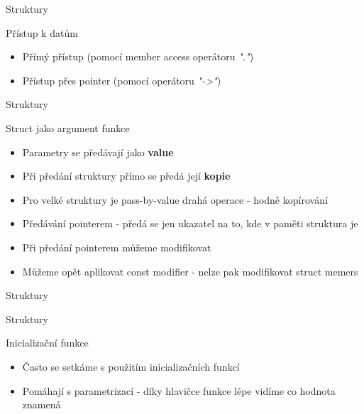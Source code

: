 \documentclass[9pt]{beamer}
\begin{document}
\begin{frame}{Struktury}
    \begin{block}{Přístup k datům}
        \begin{itemize}
            \item Přímý přístup (pomocí member access operátoru \textit{"."})
            \item Přístup přes pointer (pomocí operátoru \textit{"->"})
        \end{itemize}
    \end{block}
    
\end{frame}

\begin{frame}{Struktury}
    \begin{block}{Struct jako argument funkce}
        \begin{itemize}
            \item Parametry se předávají jako \textbf{value}
            \item Při předání struktury přímo se předá její \textbf{kopie}
            \item Pro velké struktury je pass-by-value drahá operace - hodně kopírování
            \item Předávání pointerem - předá se jen ukazatel na to, kde v paměti struktura je
            \item Při předání pointerem můžeme modifikovat
            \item Můžeme opět aplikovat const modifier - nelze pak modifikovat struct memers
        \end{itemize}
    \end{block}
\end{frame}

\begin{frame}{Struktury}
    
\end{frame}

\begin{frame}{Struktury}
    \begin{block}{Inicializační funkce}
        \begin{itemize}
            \item Často se setkáme s použitím inicializačních funkcí
            \item Pomáhají s parametrizací - díky hlavičce funkce lépe vidíme
            co hodnota znamená
        \end{itemize}
    \end{block}
    
\end{frame}
\end{document}
